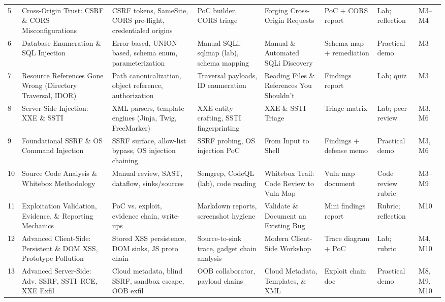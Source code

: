 \documentclass[11pt,letterpaper,oneside]{report}
\begin{document}
\begin{landscape}
\begin{longtable}{@{}R{0.45cm} R{2.085cm} R{3.614cm} R{3.336cm} R{2.919cm} R{2.363cm} R{2.363cm} R{2.780cm}@{}}
5 & Cross-Origin Trust: CSRF \& CORS Misconfigurations
  & CSRF tokens, SameSite, CORS pre-flight, credentialed origins
  & PoC builder, CORS triage
  & Forging Cross-Origin Requests
  & PoC + CORS report
  & Lab; reflection
  & M3--M4\\

6 & Database Enumeration \& SQL Injection
  & Error-based, UNION-based, schema enum, parameterization
  & Manual SQLi, sqlmap (lab), schema mapping
  & Manual \& Automated SQLi Discovery
  & Schema map + remediation
  & Practical demo
  & M3\\

7 & Resource References Gone Wrong (Directory Traversal, IDOR)
  & Path canonicalization, object reference, authorization
  & Traversal payloads, ID enumeration
  & Reading Files \& References You Shouldn't
  & Findings report
  & Lab; quiz
  & M3\\

8 & Server-Side Injection: XXE \& SSTI
  & XML parsers, template engines (Jinja, Twig, FreeMarker)
  & XXE entity crafting, SSTI fingerprinting
  & XXE \& SSTI Triage
  & Triage matrix
  & Lab; peer review
  & M3, M6\\

9 & Foundational SSRF \& OS Command Injection
  & SSRF surface, allow-list bypass, OS injection chaining
  & SSRF probing, OS injection PoC
  & From Input to Shell
  & Findings + defense memo
  & Practical demo
  & M3, M6\\

10 & Source Code Analysis \& Whitebox Methodology
  & Manual review, SAST, dataflow, sinks/sources
  & Semgrep, CodeQL (lab), code reading
  & Whitebox Trail: Code Review to Vuln Map
  & Vuln map document
  & Code review rubric
  & M3--M9\\

11 & Exploitation Validation, Evidence, \& Reporting Mechanics
  & PoC vs. exploit, evidence chain, write-ups
  & Markdown reports, screenshot hygiene
  & Validate \& Document an Existing Bug
  & Mini findings report
  & Rubric; reflection
  & M10\\

12 & Advanced Client-Side: Persistent \& DOM XSS, Prototype Pollution
  & Stored XSS persistence, DOM sinks, JS proto chain
  & Source-to-sink trace, gadget chain analysis
  & Modern Client-Side Workshop
  & Trace diagram + PoC
  & Lab; rubric
  & M4, M10\\

13 & Advanced Server-Side: Adv. SSRF, SSTI--RCE, XXE Exfil
  & Cloud metadata, blind SSRF, sandbox escape, OOB exfil
  & OOB collaborator, payload chains
  & Cloud Metadata, Templates, \& XML
  & Exploit chain doc
  & Practical demo
  & M8, M9, M10\\


\end{longtable}
\end{landscape}
\end{document}
